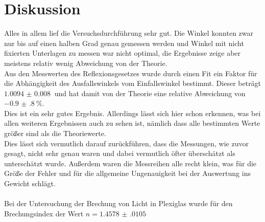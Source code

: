 \newpage
\section{Diskussion}

Alles in allem lief die Versuchsdurchführung sehr gut.
Die Winkel konnten zwar nur bis auf einen halben Grad genau gemessen werden und Winkel mit nicht fixierten Unterlagen zu messen war nicht optimal, die Ergebnisse zeige aber meistens relativ wenig Abweichung von der Theorie.\\

Aus den Messwerten des Reflexionsgesetzes wurde durch einen Fit ein Faktor für die Abhängigkeit des Ausfallswinkels vom Einfallswinkel bestimmt.
Dieser beträgt $\SI{1.0094(80)}{}$  und hat damit von der Theorie eine relative Abweichung von $\SI{-0.9(8)}{\percent}$.\\
Dies ist ein sehr gutes Ergebnis. Allerdings lässt sich hier schon erkennen, was bei allen weiteren Ergebnissen auch zu sehen ist, nämlich dass alle bestimmten Werte größer sind als die Theoriewerte.\\
Dies lässt sich vermutlich darauf zurückführen, dass die Messungen, wie zuvor gesagt, nicht sehr genau waren und dabei vermutlich öfter überschätzt als unterschätzt wurde.
Außerdem waren die Messreihen alle recht klein, was für die Größe der Fehler und für die allgemeine Ungenauigkeit bei der Auswertung ins Gewicht schlägt.\\\\
Bei der Untersuchung der Brechung von Licht in Plexiglas wurde für den Brechungsindex der Wert $n= \SI{1.4578(0105)}{}$
